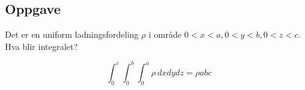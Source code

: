   \subsection*{Oppgave}
    Det er en uniform ladningsfordeling $ ρ $ i område $ 0<x<a, 0<y<b, 0<z<c $. Hva blir integralet? \newline 

    \[
    ∫_{0}^{c} ∫_{0}^{b} ∫_{0}^{a} ρ\ dxdydz = ρabc
    \]





